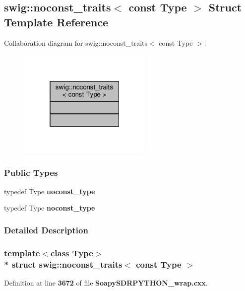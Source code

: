 \subsection{swig\+:\+:noconst\+\_\+traits$<$ const Type $>$ Struct Template Reference}
\label{structswig_1_1noconst__traits_3_01const_01Type_01_4}


Collaboration diagram for swig\+:\+:noconst\+\_\+traits$<$ const Type $>$\+:
\nopagebreak
\begin{figure}[H]
\begin{center}
\leavevmode
\includegraphics[width=184pt]{d4/d01/structswig_1_1noconst__traits_3_01const_01Type_01_4__coll__graph}
\end{center}
\end{figure}
\subsubsection*{Public Types}
\begin{DoxyCompactItemize}
\item 
typedef Type {\bf noconst\+\_\+type}
\item 
typedef Type {\bf noconst\+\_\+type}
\end{DoxyCompactItemize}


\subsubsection{Detailed Description}
\subsubsection*{template$<$class Type$>$\\*
struct swig\+::noconst\+\_\+traits$<$ const Type $>$}



Definition at line {\bf 3672} of file {\bf Soapy\+S\+D\+R\+P\+Y\+T\+H\+O\+N\+\_\+wrap.\+cxx}.



